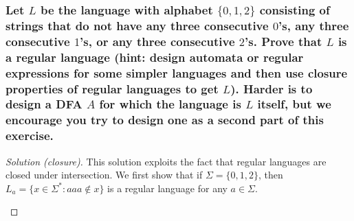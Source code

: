 \subsubsection*{Let $L$ be the language with alphabet $\{0, 1, 2\}$ consisting of strings that do not have any three consecutive $0$'s, any three consecutive $1$'s, or any three consecutive $2$'s. Prove that $L$ is a regular language (hint: design automata or regular expressions for some simpler languages and then use closure properties of regular languages to get $L$). Harder is to design a DFA $A$ for which the language is $L$ itself, but we encourage you try to design one as a second part of this exercise.}
\begin{proof}[Solution (closure)]
This solution exploits the fact that regular languages are closed under intersection. We first show that if $\Sigma = \{0, 1, 2\}$, then $L_a = \{x \in \Sigma^\ast : aaa \notin x\}$ is a regular language for any $a \in \Sigma$. %
\begin{figure}[ht]
\centering
\begin{minipage}{0.48\textwidth}
\centering
{}
\end{minipage}
\begin{minipage}{0.48\textwidth}
\centering
\begin{tikzpicture}[shorten >=1pt, shorten <= 2pt, initial distance=.5cm, >=latex, node distance=2cm, semithick, on grid, auto] 

\end{tikzpicture}
\end{minipage}
\end{figure}
\end{proof}
